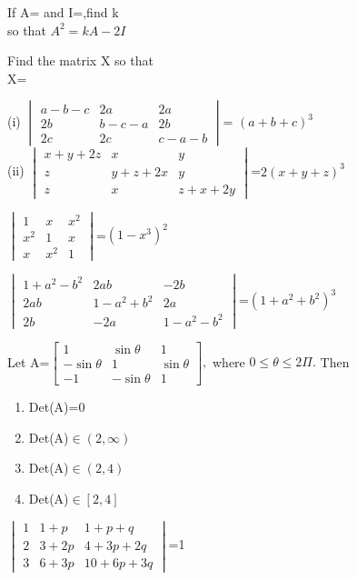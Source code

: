 \item If A= and I=,find k\\
 so that $A^2=kA-2I$\\
  \item Find the matrix X so that\\ X=\\
\item (i) $\begin{vmatrix}a-b-c& 2a& 2a \\ 2b& b-c-a& 2b \\ 2c& 2c& c-a-b\end{vmatrix}$= $(a+b+c)^3$\\
(ii) $\begin{vmatrix}x+y+2z&x&y \\ z&y+z+2x&y \\ z&x&z+x+2y\end{vmatrix}$=$2(x+y+z)^3$
\item $\begin{vmatrix}1&x&x^2 \\ x^2&1&x \\ x&x^2&1\end{vmatrix}$=$(1-x^3)^2$ 
\item $\begin{vmatrix}1+a^2-b^2&2ab&-2b \\ 2ab&1-a^2+b^2&2a \\ 2b&-2a&1-a^2-b^2\end{vmatrix}$=$(1+a^2+b^2)^3$
\item Let 
A=$\begin{bmatrix}
1&\sin\theta&1 \\ -\sin\theta&1&\sin\theta \\ -1&-\sin\theta&1
\end{bmatrix},$ 
where $0\leq \theta \leq 2\Pi.$ Then
\begin{enumerate}
\item Det(A)=0
\item Det(A)$\in(2,\infty)$
\item Det(A)$\in (2,4)$
\item Det(A)$\in [2,4]$
\end{enumerate}
\item $\begin{vmatrix}
1&1+p&1+p+q \\ 2&3+2p&4+3p+2q \\ 3&6+3p&10+6p+3q
\end{vmatrix}$=1\\
